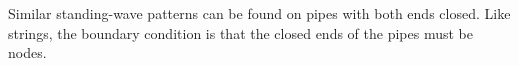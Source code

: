 Similar standing-wave patterns can be found on pipes with both ends closed.
Like strings, the boundary condition is that the closed ends of the pipes
must be nodes.
%
%  
%
%  
%
%    

